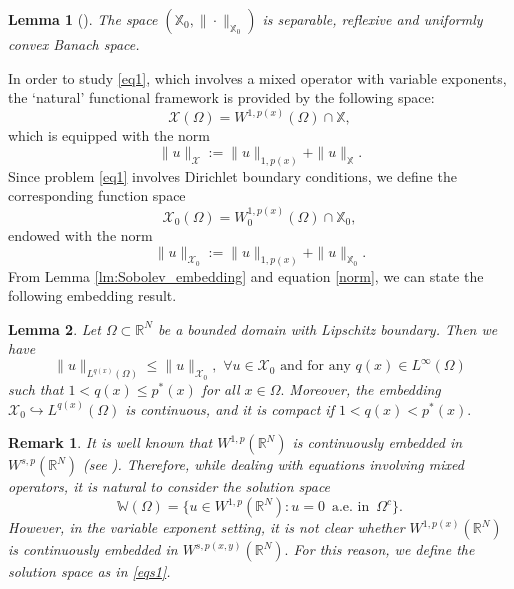 \documentclass[11pt]{article}
\newtheorem{lemma}{Lemma}[section] %
\newtheorem{remark}{Remark}[section]
\newcommand{\X}{\mathcal{X}_{0}}
\newcommand{\om} {\Omega}
\newcommand{\rnn}{\mathbb{R}^{N}}
\begin{document}
\begin{lemma}[\cite{fract_extended}]
    The space $(\mathbb{X}_0,\|\cdot\|_{\mathbb{X}_0})$
is separable, reflexive and uniformly convex Banach space.
\end{lemma}

In order to study \eqref{eq1}, 
which involves a mixed operator with 
variable exponents, the `natural' 
functional framework is provided by the following space:
$$
\mathcal{X}(\om)=W^{1,p(x)}(\om)\cap\mathbb{X},
$$
which is equipped with the norm
$$
\|u\|_{\mathcal{X}}:=\|u\|_{1,p(x)}+\|u\|_\mathbb{X}.
$$
Since problem \eqref{eq1} involves Dirichlet boundary 
conditions, we define the corresponding function space
\begin{equation}\label{eqs1}
    \X(\om)=W^{1,p(x)}_0(\om)\cap\mathbb{X}_0,
\end{equation}
endowed with the norm
\begin{equation}\label{norm}
\|u\|_{\mathcal{X}_0}:=
\|u\|_{1,p(x)}+\|u\|_{\mathbb{X}_0}.
\end{equation}
From Lemma \ref{lm:Sobolev_embedding} and 
equation \eqref{norm}, we can state the 
following embedding result.

\begin{lemma}\label{lm:space_embedd}
    Let $\om\subset\rnn$
be a bounded domain with Lipschitz boundary.
Then we have
    \begin{equation*}
        \|u\|_{L^{q(x)}(\om)}\le \|u\|_{\X},\,\,
\forall u\in\X \text{ and for any }q(x)\in L^\infty(\om)
    \end{equation*}
    such that $1<q(x)\le p^*(x)$
for all $x\in\om.$
Moreover, the embedding $\X\hookrightarrow L^{q(x)}(\om)$
is continuous, and it is compact if $1<q(x)< p^*(x).$
\end{lemma}


\begin{remark}\rm
    It is well known that $W^{1,p}(\rnn)$
is continuously embedded in $W^{s,p}(\rnn)$ (see
\cite[Lemma 2.1]{embedd_local_to_nonlocal}).
Therefore, while dealing with equations involving 
mixed operators, it is natural to consider 
the solution space
$$
\mathbb{W}(\om)=\{u\in W^{1,p}(\rnn):u=0 \,
\text{ a.e. in }\,\om^c\}.
$$
However, in the variable exponent setting, 
it is not clear whether 
$W^{1,p(x)}(\rnn)$
is continuously embedded in 
$W^{s,p(x,y)}(\rnn).$
For this reason, 
we define the solution space as in \eqref{eqs1}.
\end{remark}
\end{document}
